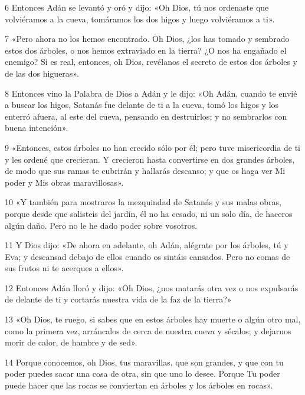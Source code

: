 \par 6 Entonces Adán se levantó y oró y dijo: «Oh Dios, tú nos ordenaste que volviéramos a la cueva, tomáramos los dos higos y luego volviéramos a ti».

\par 7 «Pero ahora no los hemos encontrado. Oh Dios, ¿los has tomado y sembrado estos dos árboles, o nos hemos extraviado en la tierra? ¿O nos ha engañado el enemigo? Si es real, entonces, oh Dios, revélanos el secreto de estos dos árboles y de las dos higueras».

\par 8 Entonces vino la Palabra de Dios a Adán y le dijo: «Oh Adán, cuando te envié a buscar los higos, Satanás fue delante de ti a la cueva, tomó los higos y los enterró afuera, al este del cueva, pensando en destruirlos; y no sembrarlos con buena intención».

\par 9 «Entonces, estos árboles no han crecido sólo por él; pero tuve misericordia de ti y les ordené que crecieran. Y crecieron hasta convertirse en dos grandes árboles, de modo que sus ramas te cubrirán y hallarás descanso; y que os haga ver Mi poder y Mis obras maravillosas».

\par 10 «Y también para mostraros la mezquindad de Satanás y sus malas obras, porque desde que salisteis del jardín, él no ha cesado, ni un solo día, de haceros algún daño. Pero no le he dado poder sobre vosotros.

\par 11 Y Dios dijo: «De ahora en adelante, oh Adán, alégrate por los árboles, tú y Eva; y descansad debajo de ellos cuando os sintáis cansados. Pero no comas de sus frutos ni te acerques a ellos».

\par 12 Entonces Adán lloró y dijo: «Oh Dios, ¿nos matarás otra vez o nos expulsarás de delante de ti y cortarás nuestra vida de la faz de la tierra?»

\par 13 «Oh Dios, te ruego, si sabes que en estos árboles hay muerte o algún otro mal, como la primera vez, arráncalos de cerca de nuestra cueva y sécalos; y dejarnos morir de calor, de hambre y de sed».

\par 14 Porque conocemos, oh Dios, tus maravillas, que son grandes, y que con tu poder puedes sacar una cosa de otra, sin que uno lo desee. Porque Tu poder puede hacer que las rocas se conviertan en árboles y los árboles en rocas».

